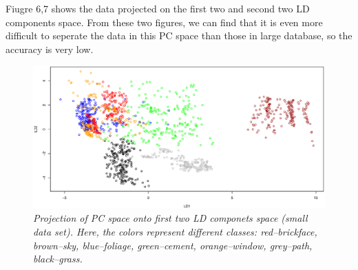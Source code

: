 \documentclass{article}
\begin{document}
 
Fiugre 6,7 shows the data projected on the first two and second two LD components space. From these two figures, we can find that it is even more 
difficult to seperate the data in this PC space than those in large database, so the accuracy is very low.

\begin{figure}[htp]
\centering
\includegraphics[width=12.1cm]{small_pcalda_LD12_train.eps}
\caption{\textit{Projection of PC space onto first two LD componets space (small data set). Here, the colors represent different classes: red--brickface, brown--sky, 
blue--foliage, green--cement, orange--window, grey--path, black--grass.}}
\end{figure}
\end{document}
